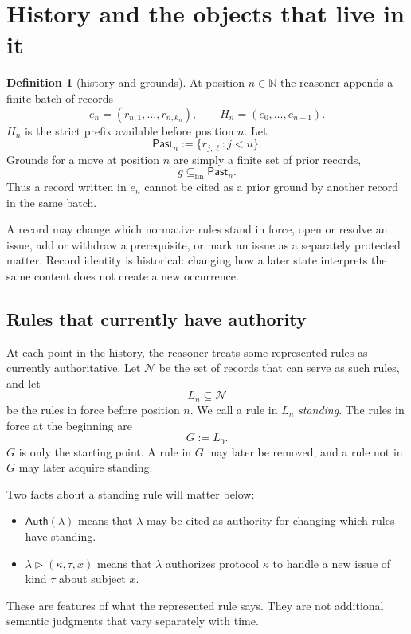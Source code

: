 \documentclass[11pt]{article}
\theoremstyle{definition}
\newtheorem*{definition}{Definition}
\theoremstyle{remark}
\newcommand{\fin}{\subseteq_{\mathrm{fin}}}
\newcommand{\Past}{\mathsf{Past}}
\newcommand{\Auth}{\mathsf{Auth}}
\begin{document}
\section{History and the objects that live in it}\label{sec:objects}

\begin{definition}[history and grounds]
At position $n\in\mathbb N$ the reasoner appends a finite batch of records
\[
 e_n=(r_{n,1},\ldots,r_{n,k_n}),
 \qquad
 H_n=(e_0,\ldots,e_{n-1}).
\]
$H_n$ is the strict prefix available before position $n$. Let
\[
 \Past_n:=\{r_{j,\ell}:j<n\}.
\]
Grounds for a move at position $n$ are simply a finite set of prior records,
\[
 g\fin\Past_n.
\]
Thus a record written in $e_n$ cannot be cited as a prior ground by another
record in the same batch.
\end{definition}

A record may change which normative rules stand in force, open or resolve an
issue, add or withdraw a prerequisite, or mark an issue as a separately
protected matter. Record identity is historical: changing how a later state
interprets the same content does not create a new occurrence.

\subsection{Rules that currently have authority}

At each point in the history, the reasoner treats some represented rules as
currently authoritative. Let $\mathcal N$ be the set of records that can serve
as such rules, and let
\[
 L_n\subseteq\mathcal N
\]
be the rules in force before position $n$. We call a rule in $L_n$
\emph{standing}. The rules in force at the beginning are
\[
 G:=L_0.
\]
$G$ is only the starting point. A rule in $G$ may later be removed, and a rule
not in $G$ may later acquire standing.

Two facts about a standing rule will matter below:
\begin{itemize}[itemsep=1pt,topsep=2pt]
 \item $\Auth(\lambda)$ means that $\lambda$ may be cited as authority for
       changing which rules have standing.
 \item $\lambda\triangleright(\kappa,\tau,x)$ means that $\lambda$ authorizes
       protocol $\kappa$ to handle a new issue of kind $\tau$ about subject $x$.
\end{itemize}
These are features of what the represented rule says. They are not additional
semantic judgments that vary separately with time.
\end{document}
